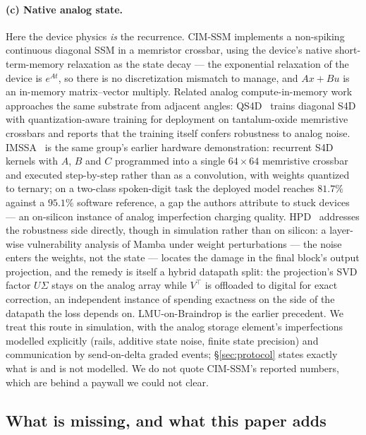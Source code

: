 \paragraph{(c) Native analog state.} Here the device physics \emph{is} the recurrence. CIM-SSM
\citep{cimssm} implements a non-spiking continuous diagonal SSM in a memristor crossbar, using
the device's native short-term-memory relaxation as the state decay --- the exponential
relaxation of the device is $e^{At}$, so there is no discretization mismatch to manage, and
$Ax + Bu$ is an in-memory matrix--vector multiply. Related analog compute-in-memory work
approaches the same substrate from adjacent angles: QS4D~\citep{qs4d} trains diagonal S4D with
quantization-aware training for deployment on tantalum-oxide memristive crossbars and reports
that the training itself confers robustness to analog noise. IMSSA~\citep{imssa} is the same
group's earlier hardware demonstration: recurrent S4D kernels with $A$, $B$ and $C$ programmed
into a single $64\times64$ memristive crossbar and executed step-by-step rather than as a
convolution, with weights quantized to ternary; on a two-class spoken-digit task the deployed
model reaches $81.7\%$ against a $95.1\%$ software reference, a gap the authors attribute to
stuck devices --- an on-silicon instance of analog imperfection charging quality. HPD~\citep{hpd} addresses the
robustness side directly, though in simulation rather than on silicon: a layer-wise
vulnerability analysis of Mamba under weight perturbations --- the noise enters the weights,
not the state --- locates the damage in the final block's output projection, and the remedy is
itself a hybrid datapath split: the projection's SVD factor $U\Sigma$ stays on the analog
array while $V^{\top}$ is offloaded to digital for exact correction, an independent instance
of spending exactness on the side of the datapath the loss depends on. LMU-on-Braindrop is the
earlier precedent. We treat this route in simulation, with the analog storage element's
imperfections modelled explicitly (rails, additive state noise, finite state precision) and
communication by send-on-delta graded events; \S\ref{sec:protocol} states exactly what is and is
not modelled. We do not quote CIM-SSM's reported numbers, which are behind a paywall we could
not clear.

\subsection{What is missing, and what this paper adds}

